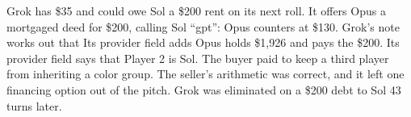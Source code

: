  Grok has \$35 and could owe Sol a \$200 rent on its next roll. It offers Opus a mortgaged deed for \$200, calling Sol ``gpt'':
Opus counters at \$130. Grok's note works out that  Its provider field adds  Opus holds \$1,926 and pays the \$200. Its provider field says that  Player 2 is Sol. The buyer paid to keep a third player from inheriting a color group. The seller's arithmetic was correct, and it left one financing option out of the pitch. Grok was eliminated on a \$200 debt to Sol 43 turns later.
